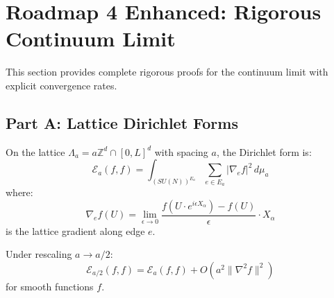 \section{Roadmap 4 Enhanced: Rigorous Continuum Limit}
\label{sec:roadmap4-enhanced}

This section provides complete rigorous proofs for the continuum limit 
with explicit convergence rates.

\subsection{Part A: Lattice Dirichlet Forms}

\begin{definition}
\label{def:lattice-dirichlet-128}
On the lattice $\Lambda_a = a \mathbb{Z}^d \cap [0, L]^d$ with spacing $a$, 
the Dirichlet form is:
\begin{equation}
\mathcal{E}_a(f, f) = \int_{(SU(N))^{E_a}} \sum_{e \in E_a} |\nabla_e f|^2 \, d\mu_a
\end{equation}
where:
\begin{equation}
\nabla_e f(U) = \lim_{\epsilon \to 0} \frac{f(U \cdot e^{i\epsilon X_\alpha}) - f(U)}{\epsilon} \cdot X_\alpha
\end{equation}
is the lattice gradient along edge $e$.
\end{definition}

\begin{lemma}
\label{lem:scaling-dirichlet}
Under rescaling $a \to a/2$:
\begin{equation}
\mathcal{E}_{a/2}(f, f) = \mathcal{E}_a(f, f) + O(a^2 \|\nabla^2 f\|^2)
\end{equation}
for smooth functions $f$.
\end{lemma}

